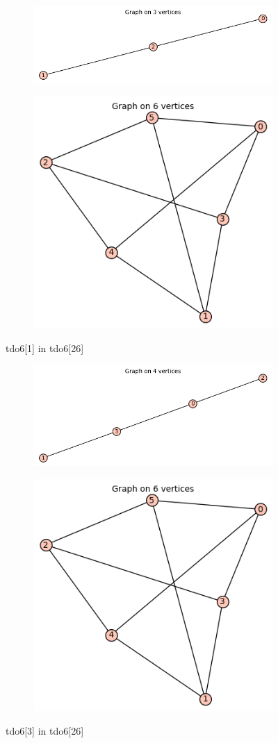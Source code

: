 \documentclass[12pt, a4paper]{article}
\begin{document}
\begin{center}
\begin{figure}[!htb]
\centering
\begin{subfigure}{0.5\textwidth}
  \centering
  \includegraphics[width=0.5\linewidth]{tdo6[1]}
\end{subfigure}%
\begin{subfigure}{0.5\textwidth}
  \centering
  \includegraphics[width=0.5\linewidth]{tdo6[26]}
\end{subfigure}
\caption{tdo6[1] in tdo6[26]}
\label{fig:test}
\end{figure}

\begin{figure}[!htb]
\centering
\begin{subfigure}{0.5\textwidth}
  \centering
  \includegraphics[width=0.5\linewidth]{tdo6[3]}
\end{subfigure}%
\begin{subfigure}{0.5\textwidth}
  \centering
  \includegraphics[width=0.5\linewidth]{tdo6[26]}
\end{subfigure}
\caption{tdo6[3] in tdo6[26]}
\label{fig:test}
\end{figure}


\end{center}
\end{document}
